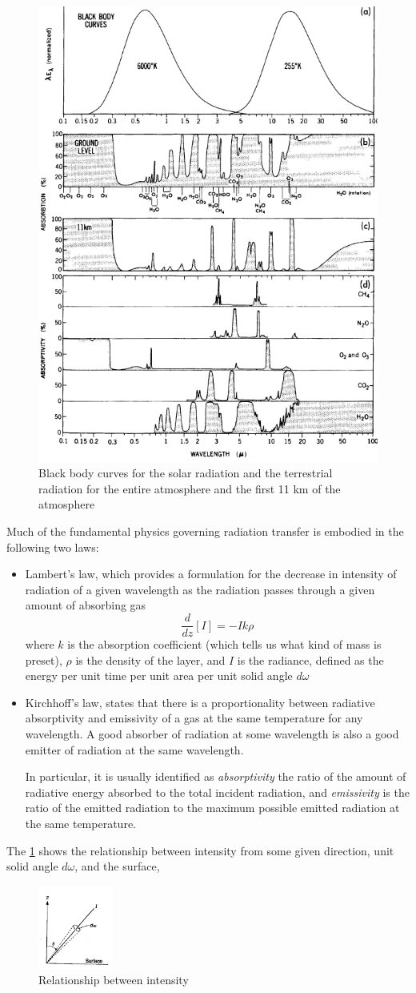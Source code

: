 \begin{figure}[htp!]
    \centering
    \includegraphics[width=0.4\linewidth]{uploads/image11.png}
    \caption{Black body curves for the solar radiation and the terrestrial radiation for the entire atmosphere and the first 11 km of the atmosphere}

\end{figure}
Much of the fundamental physics governing radiation transfer is embodied in the following two laws: 
\begin{itemize}
    \item Lambert's law, which provides a formulation for the decrease in intensity of radiation of a given wavelength as the radiation passes through a given amount of absorbing gas
$$\frac{d}{dz}[I]=-Ik\rho$$
where $k$ is the absorption coefficient (which tells us what kind of mass is preset), $\rho$ is the density of the layer, and $I$ is the radiance, defined as the energy per unit time per  unit area per unit solid angle $d\omega$

    \item Kirchhoff's law, states that there is a proportionality between radiative absorptivity and emissivity of a gas at the same temperature for any wavelength. A good absorber of radiation at some wavelength is also a good emitter of radiation at the same wavelength. 

In particular, it is usually identified as \textit{absorptivity} the ratio of the amount of radiative energy absorbed to the total incident radiation, and \textit{emissivity} is the ratio of the emitted radiation to the maximum possible emitted radiation at the same temperature.
\end{itemize}


The \ref{fig:relat} shows the relationship between intensity from some given direction, unit solid angle $d\omega$, and the surface,
\begin{figure}
  \begin{center}
    \includegraphics[width=0.22\textwidth]{uploads/imageIw.png}
  \end{center}
  \caption{Relationship between intensity}
  \label{fig:relat}
\end{figure}

